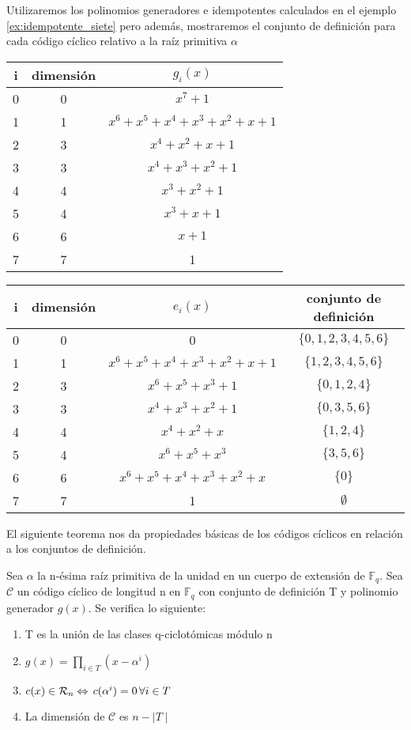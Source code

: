 \begin{exampleth}
Utilizaremos los polinomios generadores e idempotentes calculados en el ejemplo \ref{ex:idempotente_siete} pero además, mostraremos el conjunto de definición para cada código cíclico relativo a la raíz primitiva $\alpha$ 

\begin{tabular}{ c | c | c | }
	i & dimensión & $g_i(x)$ \\ \hline
	0 & 0 & $ x^7 + 1$  \\
	1 & 1 & $  x^6+x^5+x^4+x^3+x^2+x+1$  \\ 
	2 & 3 & $  x^4+x^2+x+1$ \\
	3 & 3 & $  x^4+x^3+x^2+1$  \\
	4 & 4 & $ x^3+x^2+1$  \\
	5 & 4 & $ x^3+x+1$ \\
	6 & 6 & $x+1$  \\ 
	7 & 7 & 1 

	\end{tabular}
	
	\begin{tabular}{ c | c | c | c |}
	i & dimensión & $e_i(x)$ & conjunto de definición\\ \hline
	0 & 0  & 0 & $\{ 0,1,2,3,4,5,6 \}$ \\
	1 & 1 & $x^6+x^5+x^4+x^3+x^2+x+1$  & $\{ 1,2,3,4,5,6 \}$\\ 
	2 & 3  & $x^6+x^5+x^3+1$ & $\{ 0,1,2,4 \}$\\
	3 & 3  &  $x^4+x^3+x^2+1$ & $\{ 0,3,5,6 \}$ \\
	4 & 4  & $x^4+x^2+x$ & $\{ 1,2,4 \}$ \\
	5 & 4  & $x^6+x^5+x^3$ & $\{ 3,5,6 \}$ \\
	6 & 6  & $x^6+x^5+x^4+x^3+x^2+x$ & $\{ 0 \}$ \\ 
	7 & 7  & 1 & $ \emptyset $

	\end{tabular}
\end{exampleth}

El siguiente teorema nos da propiedades básicas de los códigos cíclicos en relación a los conjuntos de definición.

\begin{theorem}
\label{th:prop_conj_def}

Sea $\alpha$ la n-ésima raíz primitiva de la unidad en un cuerpo de extensión de $\mathbb{F}_q$. Sea $\mathcal{C}$ un código cíclico de longitud n en $\mathbb{F}_q$ con conjunto de definición T y polinomio generador $g(x)$. Se verifica lo siguiente:
\begin{enumerate}
	\item T es la unión de las clases q-ciclotómicas módulo n
	\item $g(x) = \prod_{i \in T} (x-\alpha^i)$
	\item $c(x) \in \mathcal{R}_n \Leftrightarrow \thinspace c(\alpha^i) = 0 \thinspace \forall i \in T$
 	\item La dimensión de $\mathcal{C}$ es $ n - \mid T \mid$
\end{enumerate}
\end{theorem}


